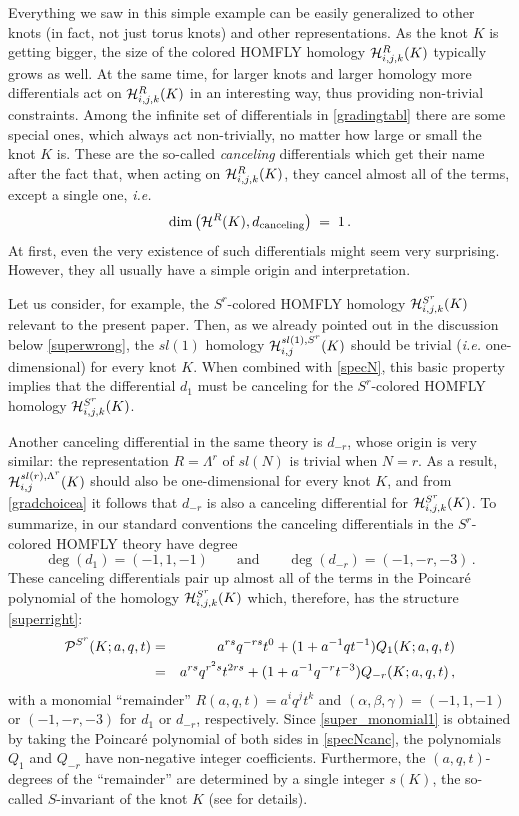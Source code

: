 \documentclass[hyper,letterpaper]{JHEP3}
\newcommand{\be}{\begin{equation}}
\newcommand{\ee}{\end{equation}}
\newcommand{\cH}{{\cal H }}
\renewcommand{\P}{{\cal P}}
\begin{document}
Everything we saw in this simple example can be easily generalized
to other knots (in fact, not just torus knots) and other representations.
As the knot $K$ is getting bigger, the size of the colored HOMFLY homology $\cH^{R}_{i,j,k} (K)$ typically grows as well.
At the same time, for larger knots and larger homology
more differentials act on $\cH^{R}_{i,j,k} (K)$ in an interesting way, thus providing non-trivial constraints.
Among the infinite set of differentials in \eqref{gradingtabl} there are some special ones,
which always act non-trivially, no matter how large or small the knot $K$ is.
These are the so-called {\it canceling} differentials which get their name after the fact that,
when acting on $\cH^{R}_{i,j,k} (K)$, they cancel almost all of the terms, except a single one, {\it i.e.}
\be
\dim \left( \cH^R (K) , d_{\text{canceling}} \right) \; = \; 1 \,.
\label{specNcanc}
\ee
At first, even the very existence of such differentials might seem very surprising.
However, they all usually have a simple origin and interpretation.

Let us consider, for example, the $S^r$-colored HOMFLY homology $\cH^{S^r}_{i,j,k} (K)$
relevant to the present paper.
Then, as we already pointed out in the discussion below \eqref{superwrong},
the $sl(1)$ homology $\cH^{sl(1), S^r}_{i,j} (K)$ should be trivial ({\it i.e.} one-dimensional) for every knot $K$.
When combined with \eqref{specN}, this basic property implies that the differential $d_1$
must be canceling for the $S^r$-colored HOMFLY homology $\cH^{S^r}_{i,j,k} (K)$.

Another canceling differential in the same theory is $d_{-r}$, whose origin is very similar:
the representation $R = \Lambda^r$ of $sl(N)$ is trivial when $N=r$.
As a result, $\cH^{sl(r), \Lambda^r}_{i,j} (K)$ should also be one-dimensional for
every knot $K$, and from \eqref{gradchoicea} it follows that $d_{-r}$ is also
a canceling differential for $\cH^{S^r}_{i,j,k} (K)$.
To summarize, in our standard conventions
the canceling differentials in the $S^r$-colored HOMFLY theory have degree
\be
\deg (d_1) = (-1,1,-1) \qquad \text{and} \qquad \deg (d_{-r}) = (-1,-r,-3) \,.
\label{dcancgrading}
\ee
These canceling differentials pair up almost all of the terms in the Poincar\'e polynomial
of the homology $\cH^{S^r}_{i,j,k} (K)$ which, therefore, has the structure \eqref{superright}:
\begin{eqnarray}
\P^{S^r} (K;a,q,t) &=& a^{rs} q^{-rs} t^{0} + (1+a^{-1}qt^{-1}) Q_1 (K;a,q,t) \nonumber \\
&=&a^{rs}q^{r^2s}t^{2rs}+(1+a^{-1}q^{-r}t^{-3}) Q_{-r} (K;a,q,t) \,,
\label{super_monomial1}
\end{eqnarray}
with a monomial ``remainder'' $R (a,q,t) = a^i q^j t^k$ and $(\alpha, \beta, \gamma) = (-1,1,-1)$
or $(-1,-r,-3)$ for $d_1$ or $d_{-r}$, respectively.
Since \eqref{super_monomial1} is obtained by taking the Poincar\'e polynomial of both sides
in \eqref{specNcanc}, the polynomials $Q_1$ and $Q_{-r}$ have non-negative integer coefficients.
Furthermore, the $(a,q,t)$-degrees of the ``remainder''
are determined by a single integer $s(K)$, the so-called $S$-invariant of the knot $K$ (see \cite{GS} for details).
\end{document}
